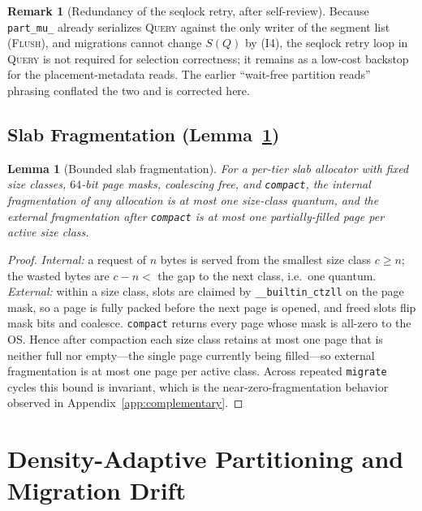 \documentclass[10pt]{article}
\newtheorem{lemma}{Lemma}
\theoremstyle{definition}
\newtheorem{remark}{Remark}
\begin{document}
\begin{remark}[Redundancy of the seqlock retry, after self-review]
Because \texttt{part\_mu\_} already serializes \textsc{Query} against the only writer of the
segment list (\textsc{Flush}), and migrations cannot change $S(Q)$ by (I4), the seqlock retry
loop in \textsc{Query} is not required for selection correctness; it remains as a low-cost
backstop for the placement-metadata reads. The earlier ``wait-free partition reads'' phrasing
conflated the two and is corrected here.
\end{remark}

\subsection{Slab Fragmentation (Lemma~\ref{lem:slab})}

\begin{lemma}[Bounded slab fragmentation]
\label{lem:slab}
For a per-tier slab allocator with fixed size classes, $64$-bit page masks, coalescing free,
and \texttt{compact}, the internal fragmentation of any allocation is at most one size-class
quantum, and the external fragmentation after \texttt{compact} is at most one partially-filled
page per active size class.
\end{lemma}
\begin{proof}
\emph{Internal:} a request of $n$ bytes is served from the smallest size class
$c\ge n$; the wasted bytes are $c-n<$ the gap to the next class, i.e.\ one quantum. \emph{External:}
within a size class, slots are claimed by \texttt{\_\_builtin\_ctzll} on the page mask, so a page
is fully packed before the next page is opened, and freed slots flip mask bits and coalesce.
\texttt{compact} returns every page whose mask is all-zero to the OS. Hence after compaction each
size class retains at most one page that is neither full nor empty---the single page currently
being filled---so external fragmentation is at most one page per active class. Across repeated
\texttt{migrate} cycles this bound is invariant, which is the near-zero-fragmentation behavior
observed in Appendix~\ref{app:complementary}.
\end{proof}

\section{Density-Adaptive Partitioning and Migration Drift}
\label{app:drift}
\end{document}
